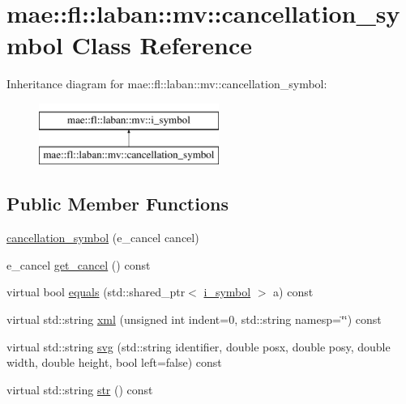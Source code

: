 \hypertarget{classmae_1_1fl_1_1laban_1_1mv_1_1cancellation__symbol}{\section{mae\-:\-:fl\-:\-:laban\-:\-:mv\-:\-:cancellation\-\_\-symbol Class Reference}
\label{classmae_1_1fl_1_1laban_1_1mv_1_1cancellation__symbol}
}
Inheritance diagram for mae\-:\-:fl\-:\-:laban\-:\-:mv\-:\-:cancellation\-\_\-symbol\-:\begin{figure}[H]
\begin{center}
\leavevmode
\includegraphics[height=2.000000cm]{classmae_1_1fl_1_1laban_1_1mv_1_1cancellation__symbol}
\end{center}
\end{figure}
\subsection*{Public Member Functions}
\begin{DoxyCompactItemize}
\item 
\hyperlink{classmae_1_1fl_1_1laban_1_1mv_1_1cancellation__symbol_afbf45dbb2de547ac725603b7fb50271b}{cancellation\-\_\-symbol} (e\-\_\-cancel cancel)
\item 
e\-\_\-cancel \hyperlink{classmae_1_1fl_1_1laban_1_1mv_1_1cancellation__symbol_a049928d086d83bb3f8dfec2a4b4c8fbd}{get\-\_\-cancel} () const 
\item 
virtual bool \hyperlink{classmae_1_1fl_1_1laban_1_1mv_1_1cancellation__symbol_a158d3eee246e2e8eda8a8884a209beca}{equals} (std\-::shared\-\_\-ptr$<$ \hyperlink{classmae_1_1fl_1_1laban_1_1mv_1_1i__symbol}{i\-\_\-symbol} $>$ a) const 
\item 
virtual std\-::string \hyperlink{classmae_1_1fl_1_1laban_1_1mv_1_1cancellation__symbol_a17122710f983a1b7308c7103e5e9e222}{xml} (unsigned int indent=0, std\-::string namesp=\char`\"{}\char`\"{}) const 
\item 
virtual std\-::string \hyperlink{classmae_1_1fl_1_1laban_1_1mv_1_1cancellation__symbol_a63cb4ffd49386728f18001301a2b29e3}{svg} (std\-::string identifier, double posx, double posy, double width, double height, bool left=false) const 
\item 
virtual std\-::string \hyperlink{classmae_1_1fl_1_1laban_1_1mv_1_1cancellation__symbol_aa2ff5bbb5398aa454e7995eeb8c1f31a}{str} () const 
\end{DoxyCompactItemize}
